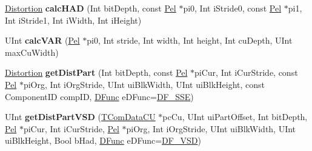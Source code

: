 \begin{DoxyCompactItemize}
\item 
\mbox{\label{class_t_com_rd_cost_a3032d9785d976e4788d58c2fb4a293c3}} 
\hyperlink{_type_def_8h_aed82b23ef6849d0bc3d95c92102d5b50}{Distortion} {\bfseries calc\+H\+AD} (Int bit\+Depth, const \hyperlink{_type_def_8h_af92141699657699b4b547be0c8517541}{Pel} $\ast$pi0, Int i\+Stride0, const \hyperlink{_type_def_8h_af92141699657699b4b547be0c8517541}{Pel} $\ast$pi1, Int i\+Stride1, Int i\+Width, Int i\+Height)
\item 
\mbox{\label{class_t_com_rd_cost_a0886223bc10af6539915a65868ffdf71}} 
U\+Int {\bfseries calc\+V\+AR} (\hyperlink{_type_def_8h_af92141699657699b4b547be0c8517541}{Pel} $\ast$pi0, Int stride, Int width, Int height, Int cu\+Depth, U\+Int max\+Cu\+Width)
\item 
\mbox{\label{class_t_com_rd_cost_a7dcc3ba0cd948ed8e28b1683cb024357}} 
\hyperlink{_type_def_8h_aed82b23ef6849d0bc3d95c92102d5b50}{Distortion} {\bfseries get\+Dist\+Part} (Int bit\+Depth, const \hyperlink{_type_def_8h_af92141699657699b4b547be0c8517541}{Pel} $\ast$pi\+Cur, Int i\+Cur\+Stride, const \hyperlink{_type_def_8h_af92141699657699b4b547be0c8517541}{Pel} $\ast$pi\+Org, Int i\+Org\+Stride, U\+Int ui\+Blk\+Width, U\+Int ui\+Blk\+Height, const Component\+ID comp\+ID, \hyperlink{_type_def_8h_ac19dbe1a542fc0c0bc8a94fcc55907c8}{D\+Func} e\+D\+Func=\hyperlink{_type_def_8h_ac19dbe1a542fc0c0bc8a94fcc55907c8a02dd0fe46fdd40822e75f94bcd350e18}{D\+F\+\_\+\+S\+SE})
\item 
\mbox{\label{class_t_com_rd_cost_a2bfb26ed8eea66bfd2e5a694483eca90}} 
U\+Int {\bfseries get\+Dist\+Part\+V\+SD} (\hyperlink{class_t_com_data_c_u}{T\+Com\+Data\+CU} $\ast$pc\+Cu, U\+Int ui\+Part\+Offset, Int bit\+Depth, \hyperlink{_type_def_8h_af92141699657699b4b547be0c8517541}{Pel} $\ast$pi\+Cur, Int i\+Cur\+Stride, \hyperlink{_type_def_8h_af92141699657699b4b547be0c8517541}{Pel} $\ast$pi\+Org, Int i\+Org\+Stride, U\+Int ui\+Blk\+Width, U\+Int ui\+Blk\+Height, Bool b\+Had, \hyperlink{_type_def_8h_ac19dbe1a542fc0c0bc8a94fcc55907c8}{D\+Func} e\+D\+Func=\hyperlink{_type_def_8h_ac19dbe1a542fc0c0bc8a94fcc55907c8a939d54d44725c6e63ad22af43bc9efee}{D\+F\+\_\+\+V\+SD})
\item 
\mbox{\label{class_t_com_rd_cost_af44c46ab7ae998f3fb8e76eb574d49fd}} 

\end{DoxyCompactItemize}

